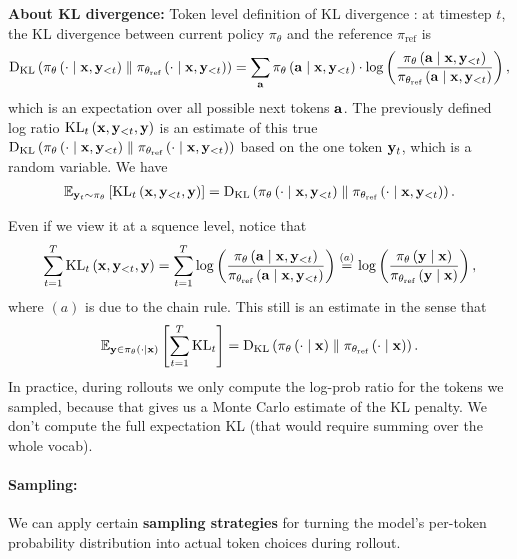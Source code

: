 \documentclass[11pt]{article}  %
\begin{document}
\textbf{About KL divergence:}
Token level definition of KL divergence : at timestep $t$, the KL divergence between current policy $\pi_{\theta}$ and the reference $\pi_{\text{ref}}$ is 
\begin{align*}
  {\rm D}_{\text{KL}}\left( \pi_{\theta}\left( \cdot \mid \mathbf{x}, \mathbf{y}_{<t} \right) \parallel \pi_{\theta_{\text{ref}}}\left( \cdot \mid \mathbf{x}, \mathbf{y}_{<t} \right) \right) = \sum_{\mathbf{a}} \pi_{\theta}\left( \mathbf{a} \mid \mathbf{x}, \mathbf{y}_{<t} \right) \cdot \log \left( \frac{\pi_{\theta}\left( \mathbf{a} \mid \mathbf{x}, \mathbf{y}_{<t} \right)}{\pi_{\theta_{\text{ref}}}\left( \mathbf{a} \mid \mathbf{x}, \mathbf{y}_{<t} \right)} \right),
\end{align*}
which is an expectation over all possible next tokens $\mathbf{a}$.
The previously defined log ratio $\text{KL}_t \left( \mathbf{x}, \mathbf{y}_{<t}, \mathbf{y} \right)$ is an estimate of this true ${\rm D}_{\text{KL}}\left( \pi_{\theta}\left( \cdot \mid \mathbf{x}, \mathbf{y}_{<t} \right) \parallel \pi_{\theta_{\text{ref}}}\left( \cdot \mid \mathbf{x}, \mathbf{y}_{<t} \right) \right)$ based on the one token $\mathbf{y}_t$, which is a random variable. We have 
\begin{align*}
  \mathbb{E}_{\mathbf{y}_t \sim \pi_{\theta}}\left[\text{KL}_t \left( \mathbf{x}, \mathbf{y}_{<t}, \mathbf{y} \right)\right] = {\rm D}_{\text{KL}}\left( \pi_{\theta}\left( \cdot \mid \mathbf{x}, \mathbf{y}_{<t} \right) \parallel \pi_{\theta_{\text{ref}}}\left( \cdot \mid \mathbf{x}, \mathbf{y}_{<t} \right) \right).
\end{align*}

Even if we view it at a squence level, notice that 
\begin{align*}
  \sum_{t=1}^{T}\text{KL}_t \left( \mathbf{x}, \mathbf{y}_{<t}, \mathbf{y} \right) = \sum_{t=1}^{T}\log \left( \frac{\pi_{\theta}\left( \mathbf{a} \mid \mathbf{x}, \mathbf{y}_{<t} \right)}{\pi_{\theta_{\text{ref}}}\left( \mathbf{a} \mid \mathbf{x}, \mathbf{y}_{<t} \right)} \right) \overset{(a)}{=} \log\left( \frac{\pi_{\theta}\left( \mathbf{y} \mid \mathbf{x} \right)}{\pi_{\theta_{\text{ref}}}\left( \mathbf{y} \mid \mathbf{x} \right)} \right),
\end{align*}
where $(a)$ is due to the chain rule. 
This still is an estimate in the sense that 
\begin{align*}
  \mathbb{E}_{\mathbf{y} \in \pi_{\theta}\left( \cdot \mid \mathbf{x} \right)}\left[\sum_{t=1}^{T}\text{KL}_t\right] = {\rm D}_{\text{KL}}\left( \pi_{\theta}\left( \cdot \mid \mathbf{x} \right) \parallel \pi_{\theta_{\text{ref}}}\left( \cdot \mid \mathbf{x} \right) \right).
\end{align*}
In practice, during rollouts we only compute the log-prob ratio for the tokens we sampled, because that gives us a Monte Carlo estimate of the KL penalty. 
We don't compute the full expectation KL (that would require summing over the whole vocab).


\paragraph{Sampling:} 
We can apply certain \textbf{sampling strategies} for turning the model's per-token probability distribution into actual token choices during rollout.
\end{document}
